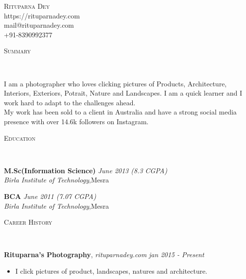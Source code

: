 \documentclass[9pt]{article}
\newenvironment{changemargin}[2]{%
  \begin{list}{}{%
    \setlength{\topsep}{0pt}%
    \setlength{\leftmargin}{#1}%
    \setlength{\rightmargin}{#2}%
    \setlength{\listparindent}{\parindent}%
    \setlength{\itemindent}{\parindent}%
    \setlength{\parsep}{\parskip}%
  }%
  \item[]}{\end{list}
}
\newcommand{\lineover}{
	\begin{changemargin}{-0.05in}{-0.05in}
		\vspace*{-8pt}
		\hrulefill \\
		\vspace*{-2pt}
	\end{changemargin}
}
\newcommand{\header}[1]{
	\begin{changemargin}{-0.5in}{-0.5in}
		\scshape{#1}\\
  	\lineover
	\end{changemargin}
}
\newcommand{\contact}[4]{
	\begin{changemargin}{-0.5in}{-0.5in}
		\begin{center}
			{\Large \scshape {#1}}\\ \smallskip
			{#2}\\ \smallskip
			{#3}\\ \smallskip
			{#4}\smallskip
		\end{center}
	\end{changemargin}
}
\newenvironment{body} {
	\vspace*{-16pt}
	\begin{changemargin}{-0.25in}{-0.5in}
  }
	{\end{changemargin}
}
\begin{document}
\contact{Rituparna Dey}{https://rituparnadey.com}{mail@rituparnadey.com}{+91-8390992377}


\header{Summary}

\begin{body}
	\vspace{14pt}
I am a photographer who loves clicking pictures of Products, Architecture, Interiors, Exteriors,
Potrait, Nature and Landscapes. I am a quick learner and I work hard to adapt to the challenges ahead.\\
My work has been sold to a client in Australia and have a strong social media presence with over 14.6k followers
on Instagram.

\end{body}

\smallskip


\header{Education}

\begin{body}
	\vspace{14pt}
  \textbf{M.Sc(Information Science)}{} \hfill \emph{June 2013 (8.3 CGPA)}{} \\
	\emph{Birla Institute of Technology},Mesra{} \\
\end{body}

\begin{body}
	\vspace{14pt}
  \textbf{BCA }{} \hfill \emph{June 2011 (7.07 CGPA)}{} \\
	\emph{Birla Institute of Technology},Mesra{} \\
\end{body}

\smallskip


\header{Career History}

\begin{body}
	\vspace{14pt}
	\textbf{Rituparna's Photography}, \emph{rituparnadey.com} \hfill \emph{jan 2015 - Present}\\
	\begin{itemize}
		\item I click pictures of product, landscapes, natures and architecture.
	\end{itemize}
	\vspace*{-4pt}
\end{body}
\end{document}
